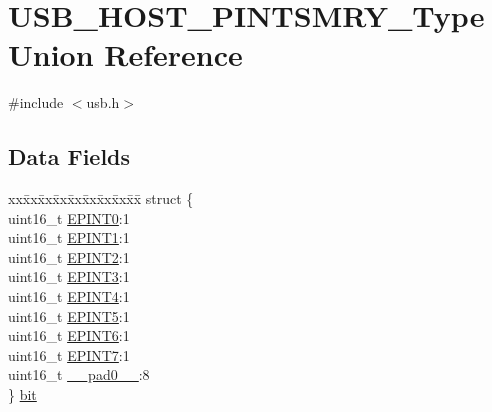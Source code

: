 \hypertarget{union_u_s_b___h_o_s_t___p_i_n_t_s_m_r_y___type}{}\section{U\+S\+B\+\_\+\+H\+O\+S\+T\+\_\+\+P\+I\+N\+T\+S\+M\+R\+Y\+\_\+\+Type Union Reference}
\label{union_u_s_b___h_o_s_t___p_i_n_t_s_m_r_y___type}


{\ttfamily \#include $<$usb.\+h$>$}

\subsection*{Data Fields}
\begin{DoxyCompactItemize}
\item 
\begin{tabbing}
xx\=xx\=xx\=xx\=xx\=xx\=xx\=xx\=xx\=\kill
struct \{\\
\>uint16\_t \mbox{\hyperlink{union_u_s_b___h_o_s_t___p_i_n_t_s_m_r_y___type_a4d26ad3e2297469cc516b6d45f3c7f39}{EPINT0}}:1\\
\>uint16\_t \mbox{\hyperlink{union_u_s_b___h_o_s_t___p_i_n_t_s_m_r_y___type_afb418ab4945c9882fbbadc0c2ae7b77b}{EPINT1}}:1\\
\>uint16\_t \mbox{\hyperlink{union_u_s_b___h_o_s_t___p_i_n_t_s_m_r_y___type_a95228f1d6fd0e7ff7b4f4fbb22220e56}{EPINT2}}:1\\
\>uint16\_t \mbox{\hyperlink{union_u_s_b___h_o_s_t___p_i_n_t_s_m_r_y___type_a572849d24d5906d9ab59f8d217757517}{EPINT3}}:1\\
\>uint16\_t \mbox{\hyperlink{union_u_s_b___h_o_s_t___p_i_n_t_s_m_r_y___type_a295643436e93719995eb614dd251c9b4}{EPINT4}}:1\\
\>uint16\_t \mbox{\hyperlink{union_u_s_b___h_o_s_t___p_i_n_t_s_m_r_y___type_af9f2a98ebe4bb1a543247c137089852e}{EPINT5}}:1\\
\>uint16\_t \mbox{\hyperlink{union_u_s_b___h_o_s_t___p_i_n_t_s_m_r_y___type_af73cf2d7e69e9b18a403dbe13f8f3450}{EPINT6}}:1\\
\>uint16\_t \mbox{\hyperlink{union_u_s_b___h_o_s_t___p_i_n_t_s_m_r_y___type_acb2f7ac05b43be1a27ebe8e216356625}{EPINT7}}:1\\
\>uint16\_t \mbox{\hyperlink{union_u_s_b___h_o_s_t___p_i_n_t_s_m_r_y___type_a77132c2c26a75f5b8751b235cda23828}{\_\_pad0\_\_}}:8\\
\} \mbox{\hyperlink{union_u_s_b___h_o_s_t___p_i_n_t_s_m_r_y___type_afa59f61f9eafe368f67aa4272ffe3743}{bit}}\\


\end{tabbing}
\end{DoxyCompactItemize}
